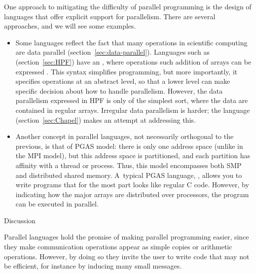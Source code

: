 
One approach to  mitigating the difficulty of parallel programming
is the design of languages that offer explicit support for
parallelism. There are several approaches, and we will see some
examples.
\begin{itemize}
\item Some languages reflect the fact that many operations in
  scientific computing are data parallel
  (section~\ref{sec:data-parallel}). Languages such as 
  (section~\ref{sec:HPF}) have
  an , where operations such addition of
  arrays can be expressed . This syntax simplifies
  programming, but more importantly, it specifies operations at an
  abstract level, so that a lower level can make specific decision
  about how to handle parallelism. However, the data parallelism
  expressed in \ac{HPF} is only of the simplest sort, where the data
  are contained in regular arrays. Irregular data parallelism is
  harder; the  language (section~\ref{sec:Chapel})
  makes an attempt at addressing this.
\item Another concept in parallel languages, not necessarily
  orthogonal to the previous, is that of \acf{PGAS} model: there is only
  one address space (unlike in the MPI model), but this address space
  is partitioned, and each partition has affinity with a thread or
  process. Thus, this model encompasses both \ac{SMP} and distributed
  shared memory. A~typical \ac{PGAS} language, , allows you
  to write programs that for the most part looks like regular C code.
  However, by indicating how the major arrays are distributed over
  processors, the program can be executed in parallel.
\end{itemize}

 {Discussion}

Parallel languages hold the promise of making parallel programming
easier, since they make communication operations appear as simple
copies or arithmetic operations. However, by doing so they invite the
user to write code that may not be efficient, for instance by inducing
many small messages. 


